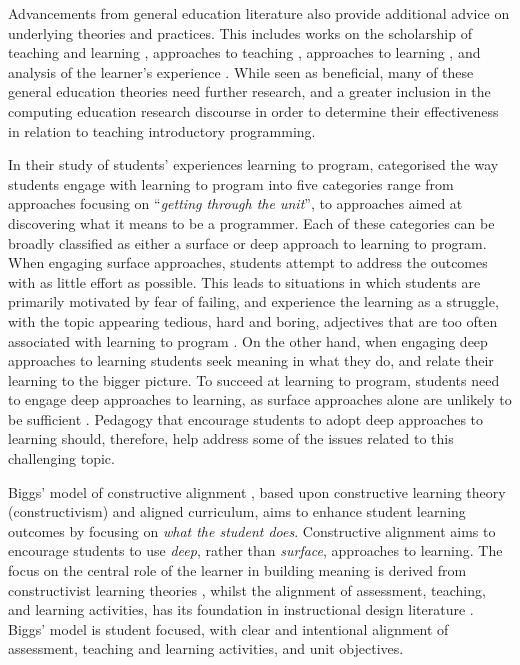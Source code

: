 Advancements from general education literature also provide additional advice on underlying theories and practices. This includes works on the scholarship of teaching and learning \cite{Boyer:1990}, approaches to teaching \cite{Martin:2000}, approaches to learning \cite{Marton:1976a,Entwistle:1991,Trigwell:1991,Trigwell:1999,Marton:2005}, and analysis of the learner's experience \cite{Marton:1997}. While seen as beneficial, many of these general education theories need further research, and a greater inclusion in the computing education research discourse in order to determine their effectiveness in relation to teaching introductory programming.

In their study of students' experiences learning to program, \citet{Bruce:2003} categorised the way students engage with learning to program into five categories range from approaches focusing on ``\emph{getting through the unit}'', to approaches aimed at discovering what it means to be a programmer. Each of these categories can be broadly classified as either a surface or deep approach to learning \cite{Marton:1976a,Ramsden:1992} to program. When engaging surface approaches, students attempt to address the outcomes with as little effort as possible. This leads to situations in which students are primarily motivated by fear of failing, and experience the learning as a struggle, with the topic appearing tedious, hard and boring, adjectives that are too often associated with learning to program \cite{McGettrick:2005}. On the other hand, when engaging deep approaches to learning students seek meaning in what they do, and relate their learning to the bigger picture. To succeed at learning to program, students need to engage deep approaches to learning, as surface approaches alone are unlikely to be sufficient \cite{Bruce:2003}. Pedagogy that encourage students to adopt deep approaches to learning should, therefore, help address some of the issues related to this challenging topic.

Biggs' model of constructive alignment \cite{Biggs:1996c,Biggs:2007}, based upon constructive learning theory (constructivism) and aligned curriculum, aims to enhance student learning outcomes by focusing on \emph{what the student does}. Constructive alignment aims to encourage students to use \emph{deep}, rather than \emph{surface}, approaches to learning. The focus on the central role of the learner in building meaning is derived from constructivist learning theories \cite{Piaget:1950,Phillips:1995,Steffe:1995,Jonassen:1991,Vrasidas:2000}, whilst the alignment of assessment, teaching, and learning activities, has its foundation in instructional design literature \cite{Tyler:1969,Cohen:1987,Ramsden:1992}. Biggs' model is student focused, with clear and intentional alignment of assessment, teaching and learning activities, and unit objectives.

